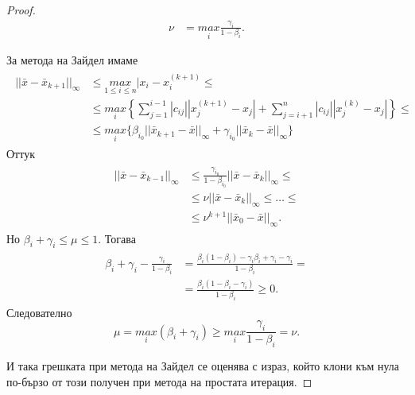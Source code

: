 \documentclass[12pt]{article}
\numberwithin{equation}{section}
\numberwithin{theorem}{section}
\numberwithin{definition}{section}
\numberwithin{corollary}{section}
\begin{document}
\begin{proof}
\begin{align*}
\nu&=\underset{i}{max}\frac{\gamma_i}{1-\beta_i}.
\end{align*}
\par
За метода на Зайдел имаме
\begin{align*}
\begin{split}
||\bar{x}-\bar{x}_{k+1}||_\infty
    &\leq\underset{1\leq i\leq n}{max}|x_i-x_i^{(k+1)}\leq\\&
    \leq\underset{i}{max}\left\{\displaystyle\sum_{j=1}^{i-1}|c_{ij}||x_j^{(k+1)}-x_j|+\displaystyle\sum_{j=i+1}^n|c_{ij}||x_j^{(k)}-x_j|\right\}\leq\\&
    \leq\underset{i}{max}\{\beta_{i_0}||\bar{x}_{k+1}-\bar{x}||_\infty+\gamma_{i_0}||\bar{x}_k-\bar{x}||_\infty\}
\end{split}
\end{align*}
Оттук
\begin{align*}
\begin{split}
||\bar{x}-\bar{x}_{k-1}||_\infty&\leq\frac{\gamma_{i_0}}{1-\beta_{i_0}}||\bar{x}-\bar{x}_k||_\infty\leq\\
                                &\leq\nu||\bar{x}-\bar{x}_k||_\infty\leq\dotso\leq\\
                                &\leq\nu^{k+1}||\bar{x}_0-\bar{x}||_\infty.
\end{split}
\end{align*}
Но $\beta_i+\gamma_i\leq\mu\leq 1.$ Тогава
\begin{align*}
\begin{split}
\beta_i+\gamma_i-\frac{\gamma_i}{1-\beta_i}&=\frac{\beta_i(1-\beta_i)-\gamma_i\beta_i+\gamma_i-\gamma_i}{1-\beta_i}=\\
                                           &=\frac{\beta_i(1-\beta_i-\gamma_i)}{1-\beta_i}\geq 0.
\end{split}
\end{align*}
Следователно
\[
\mu=\underset{i}{max}(\beta_i+\gamma_i)\geq\underset{i}{max}\frac{\gamma_i}{1-\beta_i}=\nu.
\]
\par
И така грешката при метода на Зайдел се оценява с израз, който клони към нула по-бързо от този получен при метода на простата итерация.
\end{proof}

\newpage
\end{document}
